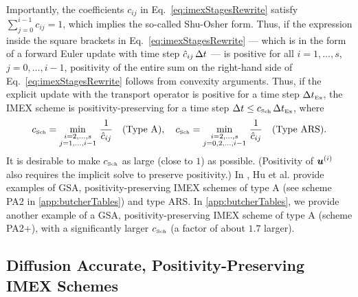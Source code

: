 Importantly, the coefficients $c_{ij}$ in Eq.~\eqref{eq:imexStagesRewrite} satisfy $\sum_{j=0}^{i-1}c_{ij}=1$, which implies the so-called Shu-Osher form.  
Thus, if the expression inside the square brackets in Eq.~\eqref{eq:imexStagesRewrite} --- which is in the form of a forward Euler update with time step $\hat{c}_{ij}\,\Delta t$ --- is positive for all $i=1,\ldots,s$, $j=0,\ldots,i-1$, positivity of the entire sum on the right-hand side of Eq.~\eqref{eq:imexStagesRewrite} follows from convexity arguments.  
Thus, if the explicit update with the transport operator is positive for a time step $\Delta t_{\mbox{\tiny Ex}}$, the IMEX scheme is positivity-preserving for a time step $\Delta t\le c_{\mbox{\tiny Sch}}\,\Delta t_{\mbox{\tiny Ex}}$, where
\begin{equation}
  c_{\mbox{\tiny Sch}}=\min_{\substack{i = 2,\ldots,s \\ 
       j = 1,\ldots,i-1}}\,\frac{1}{\hat{c}_{ij}} \quad \text{(Type A)}, \quad  c_{\mbox{\tiny Sch}}=\min_{\substack{i = 2,\ldots,s \\ 
              j = 0,2,\ldots,i-1}}\,\frac{1}{\hat{c}_{ij}} \quad \text{(Type ARS)}.
  \label{eq:imexCFL}
\end{equation}
It is desirable to make $c_{\mbox{\tiny Sch}}$ as large (close to $1$) as possible.  
(Positivity of $\boldsymbol{u}^{(i)}$ also requires the implicit solve to preserve positivity.)  
In \cite{hu_etal_2018}, Hu et al. provide examples of GSA, positivity-preserving IMEX schemes of type A (see scheme PA2 in \ref{app:butcherTables}) and type ARS.  
In \ref{app:butcherTables}, we provide another example of a GSA, positivity-preserving IMEX scheme of type A (scheme PA2+), with a significantly larger $c_{\mbox{\tiny Sch}}$ (a factor of about $1.7$ larger).  

\subsection{Diffusion Accurate, Positivity-Preserving IMEX Schemes}

